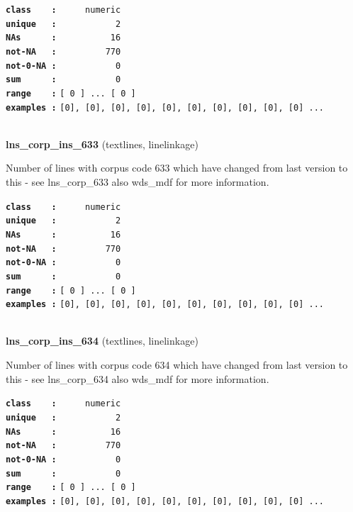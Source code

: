 \documentclass[]{article}
\begin{document}
\textbf{\texttt{class\ \ \ \ :}} \texttt{~~~~~numeric}\\
\textbf{\texttt{unique\ \ \ :}} \texttt{~~~~~~~~~~~2}\\
\textbf{\texttt{NAs\ \ \ \ \ \ :}} \texttt{~~~~~~~~~~16}\\
\textbf{\texttt{not-NA\ \ \ :}} \texttt{~~~~~~~~~770}\\
\textbf{\texttt{not-0-NA\ :}} \texttt{~~~~~~~~~~~0}\\
\textbf{\texttt{sum\ \ \ \ \ \ :}} \texttt{~~~~~~~~~~~0}\\
\textbf{\texttt{range\ \ \ \ :}}
\texttt{{[}\ 0\ {]}\ ...\ {[}\ 0\ {]}}\\
\textbf{\texttt{examples\ :}}
\texttt{{[}0{]},\ {[}0{]},\ {[}0{]},\ {[}0{]},\ {[}0{]},\ {[}0{]},\ {[}0{]},\ {[}0{]},\ {[}0{]},\ {[}0{]}\ ...}\\

~

\textbf{lns\_corp\_ins\_633} (textlines, linelinkage)

Number of lines with corpus code 633 which have changed from last
version to this - see lns\_corp\_633 also wds\_mdf for more information.

\textbf{\texttt{class\ \ \ \ :}} \texttt{~~~~~numeric}\\
\textbf{\texttt{unique\ \ \ :}} \texttt{~~~~~~~~~~~2}\\
\textbf{\texttt{NAs\ \ \ \ \ \ :}} \texttt{~~~~~~~~~~16}\\
\textbf{\texttt{not-NA\ \ \ :}} \texttt{~~~~~~~~~770}\\
\textbf{\texttt{not-0-NA\ :}} \texttt{~~~~~~~~~~~0}\\
\textbf{\texttt{sum\ \ \ \ \ \ :}} \texttt{~~~~~~~~~~~0}\\
\textbf{\texttt{range\ \ \ \ :}}
\texttt{{[}\ 0\ {]}\ ...\ {[}\ 0\ {]}}\\
\textbf{\texttt{examples\ :}}
\texttt{{[}0{]},\ {[}0{]},\ {[}0{]},\ {[}0{]},\ {[}0{]},\ {[}0{]},\ {[}0{]},\ {[}0{]},\ {[}0{]},\ {[}0{]}\ ...}\\

~

\textbf{lns\_corp\_ins\_634} (textlines, linelinkage)

Number of lines with corpus code 634 which have changed from last
version to this - see lns\_corp\_634 also wds\_mdf for more information.

\textbf{\texttt{class\ \ \ \ :}} \texttt{~~~~~numeric}\\
\textbf{\texttt{unique\ \ \ :}} \texttt{~~~~~~~~~~~2}\\
\textbf{\texttt{NAs\ \ \ \ \ \ :}} \texttt{~~~~~~~~~~16}\\
\textbf{\texttt{not-NA\ \ \ :}} \texttt{~~~~~~~~~770}\\
\textbf{\texttt{not-0-NA\ :}} \texttt{~~~~~~~~~~~0}\\
\textbf{\texttt{sum\ \ \ \ \ \ :}} \texttt{~~~~~~~~~~~0}\\
\textbf{\texttt{range\ \ \ \ :}}
\texttt{{[}\ 0\ {]}\ ...\ {[}\ 0\ {]}}\\
\textbf{\texttt{examples\ :}}
\texttt{{[}0{]},\ {[}0{]},\ {[}0{]},\ {[}0{]},\ {[}0{]},\ {[}0{]},\ {[}0{]},\ {[}0{]},\ {[}0{]},\ {[}0{]}\ ...}\\
\end{document}
